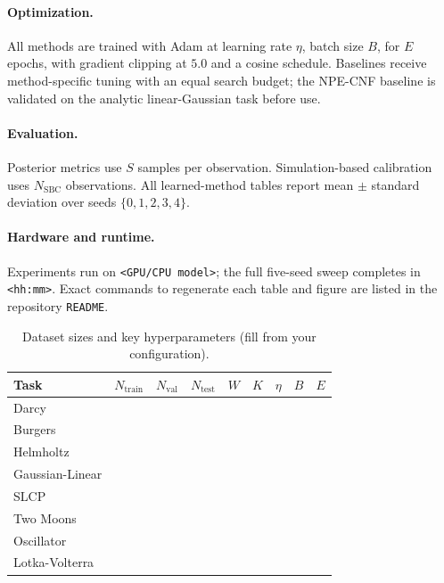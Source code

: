 \paragraph{Optimization.} All methods are trained with Adam at learning rate
$\eta$, batch size $B$, for $E$ epochs, with gradient clipping at $5.0$ and a
cosine schedule. Baselines receive method-specific tuning with an equal search
budget; the NPE-CNF baseline is validated on the analytic linear-Gaussian task
before use.

\paragraph{Evaluation.} Posterior metrics use $S$ samples per observation.
Simulation-based calibration uses $N_{\text{SBC}}$ observations. All learned-method
tables report mean $\pm$ standard deviation over seeds $\{0,1,2,3,4\}$.

\paragraph{Hardware and runtime.} Experiments run on \texttt{<GPU/CPU model>};
the full five-seed sweep completes in \texttt{<hh:mm>}. Exact commands to
regenerate each table and figure are listed in the repository \texttt{README}.

\begin{table}[h]
\centering
\caption{Dataset sizes and key hyperparameters (fill from your configuration).}
\label{tab:repro-data}
\begin{tabular}{lcccccccc}
\toprule
Task & $N_{\text{train}}$ & $N_{\text{val}}$ & $N_{\text{test}}$ & $W$ & $K$ & $\eta$ & $B$ & $E$ \\
\midrule
Darcy          & & & & & & & & \\
Burgers        & & & & & & & & \\
Helmholtz      & & & & & & & & \\
Gaussian-Linear & & & & & & & & \\
SLCP           & & & & & & & & \\
Two Moons      & & & & & & & & \\
Oscillator     & & & & & & & & \\
Lotka-Volterra & & & & & & & & \\
\bottomrule
\end{tabular}
\end{table}
